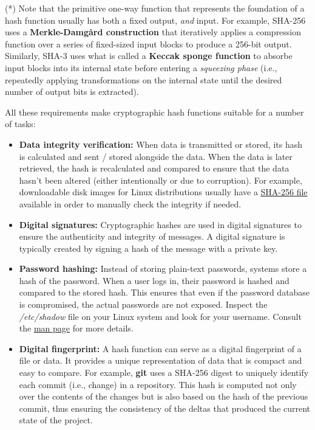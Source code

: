 (*) Note that the primitive one-way function that represents the foundation of
a hash function usually has both a fixed output, \textit{and} input. For
example, SHA-256 uses a \textbf{Merkle-Damg{\aa}rd construction} \cite{backes2012verified}
that iteratively applies a compression function over a series of fixed-sized
input blocks to produce a 256-bit output. Similarly, SHA-3 uses what is called
a \textbf{Keccak sponge function} \cite{bertoni2009keccak} to absorbe input
blocks into its internal state before entering a \textit{squeezing phase} (i.e.,
repeatedly applying transformations on the internal state until the desired
number of output bits is extracted).

All these requirements make cryptographic hash functions suitable for a number
of tasks:

\begin{itemize}
    \item \textbf{Data integrity verification:} When data is transmitted or
          stored, its hash is calculated and sent / stored alongside the data.
          When the data is later retrieved, the hash is recalculated and compared
          to ensure that the data hasn't been altered (either intentionally or
          due to corruption). For example, downloadable disk images for Linux
          distributions usually have a
          \href{https://www.releases.ubuntu.com/bionic/SHA256SUMS}{SHA-256 file}
          available in order to manually check the integrity if needed.

    \item \textbf{Digital signatures:} Cryptographic hashes are used in digital
          signatures to ensure the authenticity and integrity of messages. A
          digital signature is typically created by signing a hash of the
          message with a private key.

    \item \textbf{Password hashing:} Instead of storing plain-text passwords,
          systems store a hash of the password. When a user logs in, their
          password is hashed and compared to the stored hash. This ensures that
          even if the password database is compromised, the actual passwords are
          not exposed. Inspect the \textit{/etc/shadow} file on your Linux
          system and look for your username. Consult the
          \href{https://www.man7.org/linux/man-pages/man5/shadow.5.html}{man page}
          for more details.

    \item \textbf{Digital fingerprint:} A hash function can serve as a digital
          fingerprint of a file or data. It provides a unique representation of
          data that is compact and easy to compare. For example, \textbf{git}
          uses a SHA-256 digest to uniquely identify each commit (i.e., change)
          in a repository. This hash is computed not only over the contents of
          the changes but is also based on the hash of the previous commit, thus
          ensuring the consistency of the deltas that produced the current
          state of the project.


\end{itemize}
